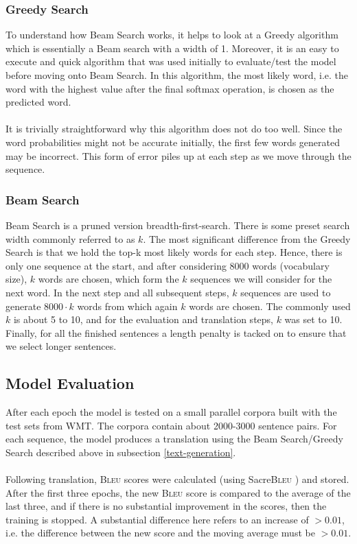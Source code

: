 \documentclass[12pt,a4paper,twoside,openright]{report}
\newcommand{\bleu}{\textsc{Bleu} }
\begin{document}
\subsubsection{Greedy Search}
To understand how Beam Search works, it helps to look at a Greedy algorithm which is essentially a Beam search with a width of 1. Moreover, it is an easy to execute and quick algorithm that was used initially to evaluate/test the model before moving onto Beam Search. In this algorithm, the most likely word, i.e. the word with the highest value after the final softmax operation, is chosen as the predicted word.
\\\\
It is trivially straightforward why this algorithm does not do too well. Since the word probabilities might not be accurate initially, the first few words generated may be incorrect. This form of error piles up at each step as we move through the sequence.

\subsubsection{Beam Search}
Beam Search is a pruned version breadth-first-search. There is some preset search width commonly referred to as $k$. The most significant difference from the Greedy Search is that we hold the top-k most likely words for each step. Hence, there is only one sequence at the start, and after considering 8000 words (vocabulary size), $k$ words are chosen, which form the $k$ sequences we will consider for the next word. In the next step and all subsequent steps, $k$ sequences are used to generate $8000 \cdot k$ words from which again $k$ words are chosen. The commonly used $k$ is about 5 to 10, and for the evaluation and translation steps, $k$ was set to 10. Finally, for all the finished sentences a length penalty is tacked on to ensure that we select longer sentences.


\subsection{Model Evaluation}
\label{model-evaluation}
After each epoch
the model is tested on a small parallel corpora built with the test sets from WMT. The corpora contain about 2000-3000 sentence pairs. For each sequence, the model produces a translation using the Beam Search/Greedy Search described above in subsection \ref{text-generation}.
\\\\
Following translation, \bleu scores were calculated (using Sacre\bleu) and stored.
After the first three epochs, the new \bleu score is compared to the average of the last three, and if there is no substantial improvement in the scores, then the training is stopped. A substantial difference here refers to an increase of $> 0.01$, i.e. the difference between the new score and the moving average must be $> 0.01$.
\end{document}
